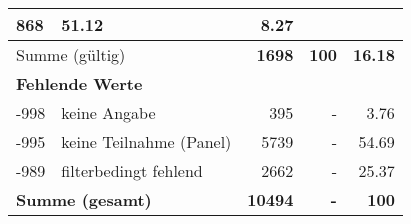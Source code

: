 \begin{longtable}{lXrrr}
       \num{868} &
       \num[round-mode=places,round-precision=2]{51,12} &
         \num[round-mode=places,round-precision=2]{8,27} \\
     \midrule
     \multicolumn{2}{l}{Summe (gültig)} &
       \textbf{\num{1698}} &
     \textbf{100} &
       \textbf{\num[round-mode=places,round-precision=2]{16,18}} \\
     \multicolumn{5}{l}{\textbf{Fehlende Werte}}\\
       -998 &
       keine Angabe &
         \num{395} &
        - &
         \num[round-mode=places,round-precision=2]{3,76} \\
       -995 &
       keine Teilnahme (Panel) &
         \num{5739} &
        - &
         \num[round-mode=places,round-precision=2]{54,69} \\
       -989 &
       filterbedingt fehlend &
         \num{2662} &
        - &
         \num[round-mode=places,round-precision=2]{25,37} \\
     \midrule
     \multicolumn{2}{l}{\textbf{Summe (gesamt)}} &
          \textbf{\num{10494}} &
        \textbf{-} &
        \textbf{100} \\
     \bottomrule
     \end{longtable}
     
